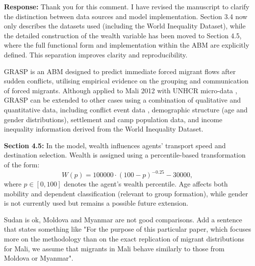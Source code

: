 \documentclass[11pt,a4paper]{article}
\begin{document}
\textbf{Response:}
Thank you for this comment. I have revised the manuscript to clarify the distinction between data sources and model implementation. Section 3.4 now only describes the datasets used (including the World Inequality Dataset), while the detailed construction of the wealth variable has been moved to Section 4.5, where the full functional form and implementation within the ABM are explicitly defined. This separation improves clarity and reproducibility.

\vspace{0.5cm}

\begin{updatebox}
GRASP is an ABM designed to predict immediate forced migrant flows after sudden conflicts, utilising empirical evidence on the grouping and communication of forced migrants. Although applied to Mali 2012 with UNHCR micro-data \citep{He-In}, GRASP can be extended to other cases using a combination of qualitative and quantitative data, including conflict event data \citep{243-acled2024data}, demographic structure (age and gender distributions), settlement and camp population data, and income inequality information derived from the World Inequality Dataset.

\medbreak

\textbf{Section 4.5: } In the model, wealth influences agents’ transport speed and destination selection. Wealth is assigned using a percentile-based transformation of the form:
\begin{equation}
W(p) = 100000 \cdot (100 - p)^{-0.25} - 30000,
\end{equation}
where \(p \in [0,100]\) denotes the agent’s wealth percentile. Age affects both mobility and dependent classification (relevant to group formation), while gender is not currently used but remains a possible future extension.
\end{updatebox}

\vspace{0.5cm}


\begin{reviewbox}

Sudan is ok, Moldova and Myanmar are not good comparisons. Add a sentence that states something like "For the purpose of this particular paper, which focuses more on the methodology than on the exact replication of migrant distributions for Mali, we assume that migrants in Mali behave similarly to those from Moldova or Myanmar".

\end{reviewbox}
\end{document}

